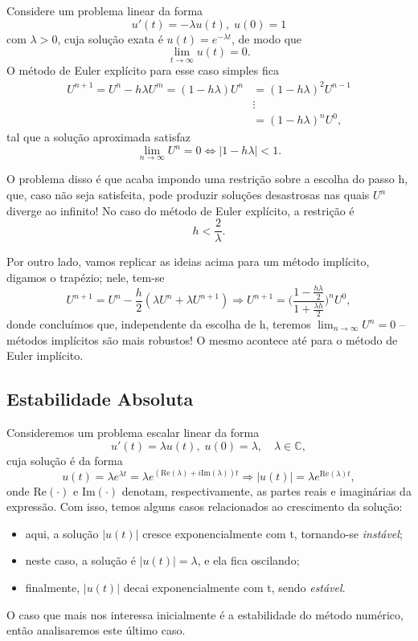 \documentclass[../differential_methods.tex]{subfiles}
\begin{document}
Considere um problema linear da forma
\[
	u'(t) = -\lambda u(t),\; u(0)=1
\]
com \(\lambda > 0\), cuja solução exata é \(u(t) = e^{-\lambda t}\), de modo que
\[
	\lim_{t\to \infty}u(t) = 0.
\]
O método de Euler explícito para esse caso simples fica
\begin{align*}
	U^{n+1} = U^{n}-h\lambda U^{m} = (1-h\lambda ) U ^{n} & = (1-h\lambda )^{2}U^{n-1} \\
	                                                      & \vdots                     \\
	                                                      & = (1-h\lambda )^{n}U^{0},
\end{align*}
tal que a solução aproximada satisfaz
\[
	\lim_{n\to \infty}U^{n} = 0 \Longleftrightarrow | 1-h\lambda  |<1.
\]

O problema disso é que acaba impondo uma restrição sobre a escolha do passo h, que, caso não seja satisfeita, pode produzir soluções desastrosas nas quais \(U^{n}\) diverge ao infinito! No caso do método de Euler explícito, a restrição é
\[
	h < \frac{2}{\lambda }.
\]

Por outro lado, vamos replicar as ideias acima para um método implícito, digamos o trapézio; nele, tem-se
\[
	U^{n+1} = U^{n} - \frac{h}{2}(\lambda U^{n} + \lambda U^{n+1}) \Rightarrow U^{n+1} = \biggl(\frac{1-\frac{h\lambda }{2}}{1+\frac{\lambda h}{2}}\biggr)^{n}U^{0},
\]
donde concluímos que, independente da escolha de h, teremos \(\lim_{n\to \infty}U^{n}=0\) -- métodos implícitos são mais robustos! O mesmo acontece até para o método de Euler implícito.

\subsection{Estabilidade Absoluta}
Consideremos um problema escalar linear da forma
\[
	u'(t) = \lambda u(t),\; u(0) = \lambda ,\quad \lambda \in \mathbb{C},
\]
cuja solução é da forma
\[
	u(t) = \lambda e^{\lambda t} = \lambda e^{(\mathrm{Re}(\lambda ) + i \mathrm{Im}(\lambda ))t} \Rightarrow | u(t) | = \lambda e^{\mathrm{Re}(\lambda )t},
\]
onde \(\mathrm{Re}(\cdot )\) e \(\mathrm{Im}(\cdot )\) denotam, respectivamente, as partes reais e imaginárias da expressão. Com isso, temos alguns casos relacionados ao crescimento da solução:

\begin{itemize}
	\item[\(\mathrm{Re}(\lambda )>0\):] aqui, a solução \(| u(t) |\) cresce exponencialmente com t, tornando-se \textit{instável};
	\item[\(\mathrm{Re}(\lambda )=0\):] neste caso, a solução é \(| u(t) | = \lambda \), e ela fica oscilando;
	\item[\(\mathrm{Re}(\lambda )<0\):] finalmente, \(| u(t) |\) decai exponencialmente com t, sendo \textit{estável}.
\end{itemize}
O caso que mais nos interessa inicialmente é a estabilidade do método numérico, então analisaremos este último caso.
\end{document}
